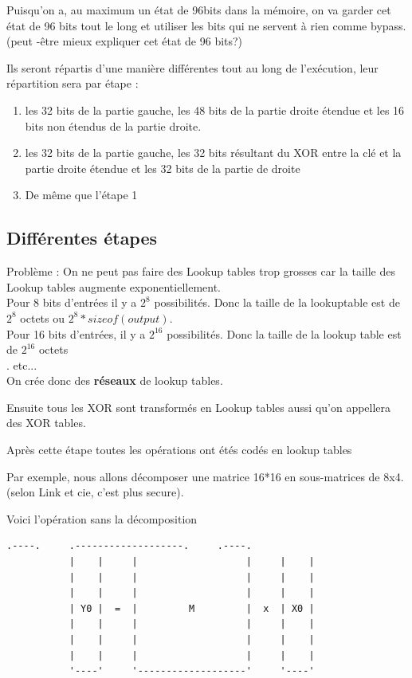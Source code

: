 \documentclass[a4paper,12pt]{article}
\begin{document}
Puisqu'on a, au maximum un état de 96bits dans la mémoire, on va garder cet état de 96 bits tout le long et utiliser les bits qui ne servent à rien comme bypass.\\

(peut -être mieux expliquer cet état de 96 bits?)

Ils seront répartis d'une manière différentes tout au long de l'exécution, leur répartition sera par étape :
\begin{enumerate}
\item les 32 bits de la partie gauche, les 48 bits de la partie droite étendue et les 16 bits non étendus de la partie droite.
\item les 32 bits de la partie gauche, les 32 bits résultant du XOR entre la clé et la partie droite étendue et les 32 bits de la partie de droite
\item De même que l'étape 1
\end{enumerate}

\subsection{Différentes étapes}


Problème :
On ne peut pas faire des Lookup tables trop grosses car la taille des Lookup tables augmente exponentiellement.\\

Pour 8 bits d'entrées il y a $2^{8}$ possibilités. Donc la taille de la lookuptable est de $2^{8}$ octets ou $2^{8} * sizeof(output)$.\\
Pour 16 bits d'entrées, il y a $2^{16}$ possibilités. Donc la taille de la lookup table est de $2^{16}$ octets\\.
etc...\\

On crée donc des \textbf{réseaux} de lookup tables.

Ensuite tous les XOR sont transformés en Lookup tables aussi qu'on appellera des XOR tables.

Après cette étape toutes les opérations ont étés codés en lookup tables

Par exemple, nous allons décomposer une matrice 16*16 en sous-matrices de 8x4. (selon Link et cie, c'est plus secure).

Voici l'opération sans la décomposition

\begin{Verbatim}[samepage=true]
           .----.     .-------------------.     .----.
           |    |     |                   |     |    |
           |    |     |                   |     |    |
           |    |     |                   |     |    |
           | Y0 |  =  |         M         |  x  | X0 |
           |    |     |                   |     |    |
           |    |     |                   |     |    |
           |    |     |                   |     |    |
           '----'     '-------------------'     '----'

\end{Verbatim}
\end{document}
